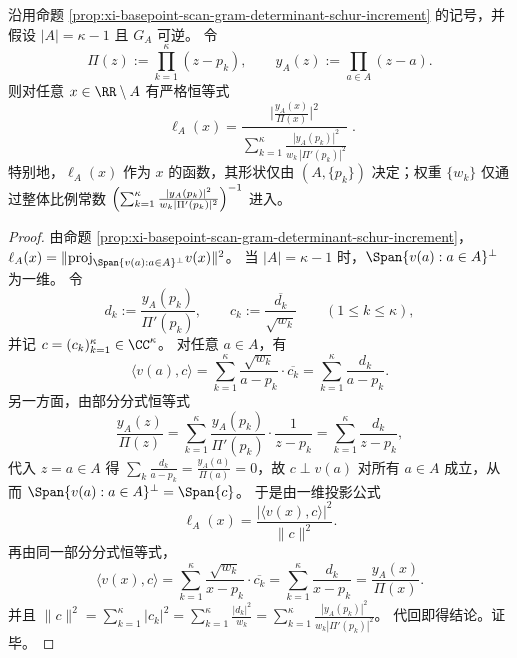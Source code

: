 \begin{theorem}\label{thm:xi-basepoint-scan-leverage-gap-codim1-closed-form}
沿用命题 \ref{prop:xi-basepoint-scan-gram-determinant-schur-increment} 的记号，并假设 \(|A|=\kappa-1\) 且 \(G_A\) 可逆。
令
\[
\Pi(z):=\prod_{k=1}^{\kappa}(z-p_k),
\qquad
y_A(z):=\prod_{a\in A}(z-a).
\]
则对任意 \(x\in\RR\setminus A\) 有严格恒等式
\[
\boxed{\;
\ell_A(x)
=
\frac{\bigl|\frac{y_A(x)}{\Pi(x)}\bigr|^2}{
\displaystyle\sum_{k=1}^{\kappa}\frac{|y_A(p_k)|^2}{w_k\,|\Pi'(p_k)|^2}
}\; }.
\]
特别地，\(\ell_A(x)\) 作为 \(x\) 的函数，其形状仅由 \((A,\{p_k\})\) 决定；权重 \(\{w_k\}\) 仅通过整体比例常数
\(
\Bigl(\sum_{k=1}^{\kappa}\frac{|y_A(p_k)|^2}{w_k|\Pi'(p_k)|^2}\Bigr)^{-1}
\)
进入。
\end{theorem}
\begin{proof}
由命题 \ref{prop:xi-basepoint-scan-gram-determinant-schur-increment}，
\(
\ell_A(x)=\| \mathrm{proj}_{\Span\{v(a):a\in A\}^\perp}v(x)\|^2
\)。
当 \(|A|=\kappa-1\) 时，\(\Span\{v(a):a\in A\}^\perp\) 为一维。
令
\[
d_k:=\frac{y_A(p_k)}{\Pi'(p_k)},
\qquad
c_k:=\frac{\overline{d_k}}{\sqrt{w_k}}
\qquad(1\le k\le \kappa),
\]
并记 \(c=(c_k)_{k=1}^{\kappa}\in\CC^\kappa\)。
对任意 \(a\in A\)，有
\[
\langle v(a),c\rangle
=\sum_{k=1}^{\kappa}\frac{\sqrt{w_k}}{a-p_k}\cdot\overline{c_k}
=\sum_{k=1}^{\kappa}\frac{d_k}{a-p_k}.
\]
另一方面，由部分分式恒等式
\[
\frac{y_A(z)}{\Pi(z)}
=\sum_{k=1}^{\kappa}\frac{y_A(p_k)}{\Pi'(p_k)}\cdot\frac{1}{z-p_k}
=\sum_{k=1}^{\kappa}\frac{d_k}{z-p_k},
\]
代入 \(z=a\in A\) 得
\(
\sum_k\frac{d_k}{a-p_k}=\frac{y_A(a)}{\Pi(a)}=0
\)，故 \(c\perp v(a)\) 对所有 \(a\in A\) 成立，从而
\(
\Span\{v(a):a\in A\}^\perp=\Span\{c\}
\)。
于是由一维投影公式
\[
\ell_A(x)=\frac{|\langle v(x),c\rangle|^2}{\|c\|^2}.
\]
再由同一部分分式恒等式，
\[
\langle v(x),c\rangle
=\sum_{k=1}^{\kappa}\frac{\sqrt{w_k}}{x-p_k}\cdot\overline{c_k}
=\sum_{k=1}^{\kappa}\frac{d_k}{x-p_k}
=\frac{y_A(x)}{\Pi(x)}.
\]
并且
\(
\|c\|^2=\sum_{k=1}^{\kappa}|c_k|^2=\sum_{k=1}^{\kappa}\frac{|d_k|^2}{w_k}
=\sum_{k=1}^{\kappa}\frac{|y_A(p_k)|^2}{w_k|\Pi'(p_k)|^2}
\)。
代回即得结论。证毕。
\end{proof}

